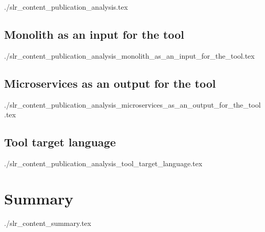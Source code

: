   {./slr_content_publication_analysis.tex}
  \subsection{Monolith as an input for the tool}
  {./slr_content_publication_analysis_monolith_as_an_input_for_the_tool.tex}
  \subsection{Microservices as an output for the tool}
  {./slr_content_publication_analysis_microservices_as_an_output_for_the_tool.tex}
  \subsection{Tool target language}
  {./slr_content_publication_analysis_tool_target_language.tex}

\section{Summary}\label{sub:summary}
  {./slr_content_summary.tex}
